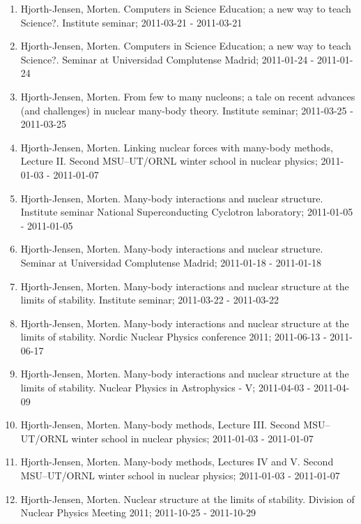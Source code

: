 \documentclass[%
oneside,                 %
final,                   %
10pt]{article}
\begin{document}
\begin{enumerate}
\item Hjorth-Jensen, Morten.  Computers in Science Education; a new way to teach Science?. Institute seminar; 2011-03-21 - 2011-03-21

\item Hjorth-Jensen, Morten.  Computers in Science Education; a new way to teach Science?. Seminar at Universidad Complutense Madrid; 2011-01-24 - 2011-01-24

\item Hjorth-Jensen, Morten.  From few to many nucleons; a tale on recent advances (and challenges) in nuclear many-body theory. Institute seminar; 2011-03-25 - 2011-03-25

\item Hjorth-Jensen, Morten. Linking nuclear forces with many-body methods, Lecture II. Second MSU--UT/ORNL winter school in nuclear physics; 2011-01-03 - 2011-01-07

\item Hjorth-Jensen, Morten.  Many-body interactions and nuclear structure. Institute seminar National Superconducting Cyclotron laboratory; 2011-01-05 - 2011-01-05

\item Hjorth-Jensen, Morten.  Many-body interactions and nuclear structure. Seminar at Universidad Complutense Madrid; 2011-01-18 - 2011-01-18

\item Hjorth-Jensen, Morten.  Many-body interactions and nuclear structure at the limits of stability. Institute seminar; 2011-03-22 - 2011-03-22

\item Hjorth-Jensen, Morten.  Many-body interactions and nuclear structure at the limits of stability. Nordic Nuclear Physics conference 2011; 2011-06-13 - 2011-06-17

\item Hjorth-Jensen, Morten.  Many-body interactions and nuclear structure at the limits of stability. Nuclear Physics in Astrophysics - V; 2011-04-03 - 2011-04-09

\item Hjorth-Jensen, Morten.  Many-body methods, Lecture III. Second MSU--UT/ORNL winter school in nuclear physics; 2011-01-03 - 2011-01-07

\item Hjorth-Jensen, Morten.  Many-body methods, Lectures IV and V. Second MSU--UT/ORNL winter school in nuclear physics; 2011-01-03 - 2011-01-07

\item Hjorth-Jensen, Morten.  Nuclear structure at the limits of stability. Division of Nuclear Physics Meeting 2011; 2011-10-25 - 2011-10-29


\end{enumerate}
\end{document}
